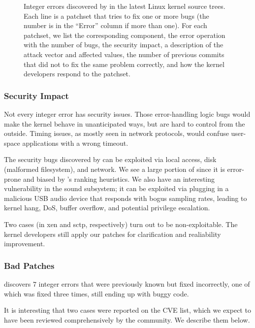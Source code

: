\begin{figure*}
\centering
\footnotesize

\caption{Integer errors discovered by \sys in the latest Linux
kernel source trees.  Each line is a patchset that tries to fix one
or more bugs (the number is in the ``Error'' column if more than
one).  For each patchset, we list the corresponding component, the
error operation with the number of bugs, the security impact, a
description of the attack vector and affected values, the number
of previous commits that did not to fix the same problem correctly,
and how the kernel developers respond to the patchset.}
\label{f:data:linux}
\end{figure*}

\subsubsection{Security Impact}

Not every integer error has security issues.  Those error-handling
logic bugs would make the kernel behave in unanticipated ways, but
are hard to control from the outside.  Timing issues, as mostly
seen in network protocols, would confuse user-space applications
with a wrong timeout.

The security bugs discovered by \sys can be exploited via local
access, disk (malformed filesystem), and network.  We see a large
portion of  since it is error-prone and biased by \sys's
ranking heuristics.  We also have an interesting vulnerability in
the sound subsystem; it can be exploited via plugging in a malicious
USB audio device that responds with bogus sampling rates, leading
to kernel hang, DoS, buffer overflow, and potential privilege
escalation.

Two cases (in xen and sctp, respectively) turn out to be non-exploitable.
The kernel developers still apply our patches for clarification and
realiability improvement.

\subsubsection{Bad Patches}

\sys discovers 7 integer errors that were previously known but fixed
incorrectly, one of which was fixed three times, still ending up
with buggy code.

It is interesting that two cases were reported on the CVE list,
which we expect to have been reviewed comprehensively by the
community.  We describe them below.

